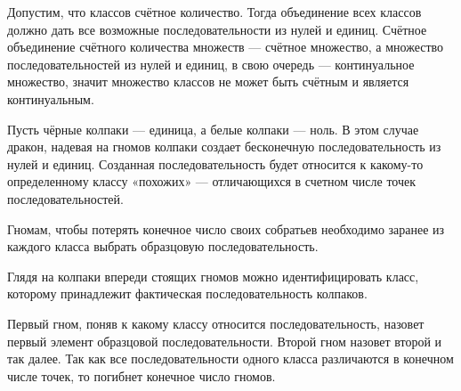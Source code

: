 \begin{solution}{1.26}
\begin{center}
\end{center}

Допустим, что классов счётное количество. Тогда объединение всех классов должно дать все возможные последовательности из нулей и единиц. Счётное объединение счётного количества множеств --- счётное множество, а множество последовательностей из нулей и единиц, в свою очередь --- континуальное множество, значит множество классов не может быть счётным и является континуальным.

\end{solution}
\begin{solution}{1.27}
Пусть чёрные колпаки --- единица, а белые колпаки --- ноль. В этом случае дракон, надевая на гномов колпаки создает бесконечную последовательность из нулей и единиц. Созданная последовательность будет относится к какому-то определенному классу «похожих» --- отличающихся в счетном числе точек последовательностей.

Гномам, чтобы потерять конечное число своих собратьев необходимо заранее из каждого класса выбрать образцовую последовательность.

Глядя на колпаки впереди стоящих гномов можно идентифицировать класс, которому принадлежит фактическая последовательность колпаков.

Первый гном, поняв к какому классу относится последовательность, назовет первый элемент образцовой последовательности. Второй гном назовет второй и так далее. Так как все последовательности одного класса различаются в конечном числе точек, то погибнет конечное число гномов.
\end{solution}
